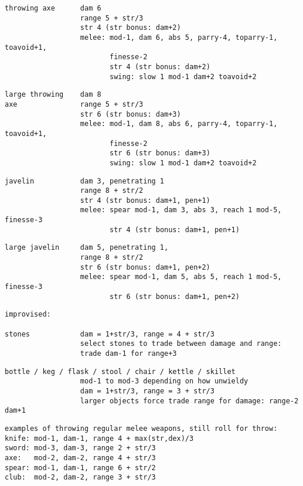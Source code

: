 \begin{samepage}
\begin{verbatim}
\end{verbatim} \blocklistgap \begin{verbatim}
throwing axe      dam 6
                  range 5 + str/3
                  str 4 (str bonus: dam+2)
                  melee: mod-1, dam 6, abs 5, parry-4, toparry-1, toavoid+1,
                         finesse-2
                         str 4 (str bonus: dam+2)
                         swing: slow 1 mod-1 dam+2 toavoid+2
\end{verbatim} \blocklistgap \begin{verbatim}
large throwing    dam 8
axe               range 5 + str/3
                  str 6 (str bonus: dam+3)
                  melee: mod-1, dam 8, abs 6, parry-4, toparry-1, toavoid+1,
                         finesse-2
                         str 6 (str bonus: dam+3)
                         swing: slow 1 mod-1 dam+2 toavoid+2
\end{verbatim} \blocklistgap \begin{verbatim}
javelin           dam 3, penetrating 1
                  range 8 + str/2
                  str 4 (str bonus: dam+1, pen+1)
                  melee: spear mod-1, dam 3, abs 3, reach 1 mod-5, finesse-3
                         str 4 (str bonus: dam+1, pen+1)
\end{verbatim} \blocklistgap \begin{verbatim}
large javelin     dam 5, penetrating 1,
                  range 8 + str/2
                  str 6 (str bonus: dam+1, pen+2)
                  melee: spear mod-1, dam 5, abs 5, reach 1 mod-5, finesse-3
                         str 6 (str bonus: dam+1, pen+2)
\end{verbatim} \blocklistgap \begin{verbatim}
improvised:

stones            dam = 1+str/3, range = 4 + str/3
                  select stones to trade between damage and range:
                  trade dam-1 for range+3
\end{verbatim} \blocklistgap \begin{verbatim}
bottle / keg / flask / stool / chair / kettle / skillet
                  mod-1 to mod-3 depending on how unwieldy
                  dam = 1+str/3, range = 3 + str/3
                  larger objects force trade range for damage: range-2 dam+1
\end{verbatim} \blocklistgap \begin{verbatim}
examples of throwing regular melee weapons, still roll for throw:
knife: mod-1, dam-1, range 4 + max(str,dex)/3
sword: mod-3, dam-3, range 2 + str/3
axe:   mod-2, dam-2, range 4 + str/3
spear: mod-1, dam-1, range 6 + str/2
club:  mod-2, dam-2, range 3 + str/3
\end{verbatim} \end{samepage} \normalsize \goodbreak

